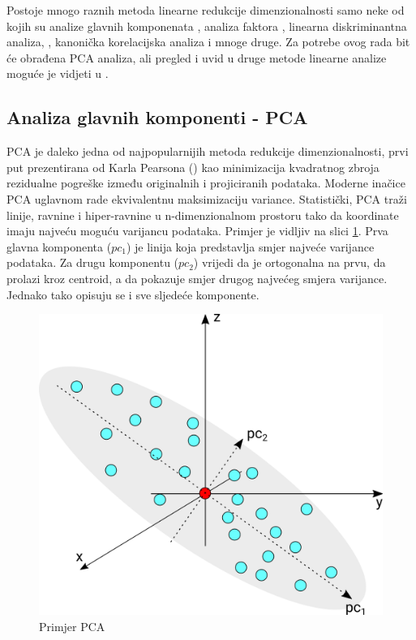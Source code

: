 \documentclass[times, utf8, diplomski]{fer}
\begin{document}
Postoje mnogo raznih metoda linearne redukcije dimenzionalnosti samo neke od kojih su analize glavnih komponenata , analiza faktora , linearna diskriminantna analiza, , kanonička korelacijska analiza  i mnoge druge. Za potrebe ovog rada bit će obrađena PCA analiza, ali pregled i uvid u druge metode linearne analize moguće je vidjeti u \cite{cunningham2015linear}.

\subsection{Analiza glavnih komponenti - PCA}

PCA je daleko jedna od najpopularnijih metoda redukcije dimenzionalnosti, prvi put prezentirana od Karla Pearsona (\citeyear{pearson1901liii}) kao minimizacija kvadratnog zbroja rezidualne pogreške između originalnih i projiciranih podataka. Moderne inačice PCA uglavnom rade ekvivalentnu maksimizaciju variance. Statistički, PCA traži linije, ravnine i hiper-ravnine u n-dimenzionalnom prostoru tako da koordinate imaju najveću moguću varijancu podataka. Primjer je vidljiv na slici \ref{fig:pca}. Prva glavna komponenta ($pc_1$) je linija koja predstavlja smjer najveće varijance podataka. Za drugu komponentu ($pc_2$) vrijedi da je ortogonalna na prvu, da prolazi kroz centroid, a da pokazuje smjer drugog najvećeg smjera varijance. Jednako tako opisuju se i sve sljedeće komponente.
\begin{figure}[htb]
    \centering
    \includegraphics{resources/images/reduction/pca.png}
    \caption{Primjer PCA}
    \label{fig:pca}
\end{figure}
\end{document}
